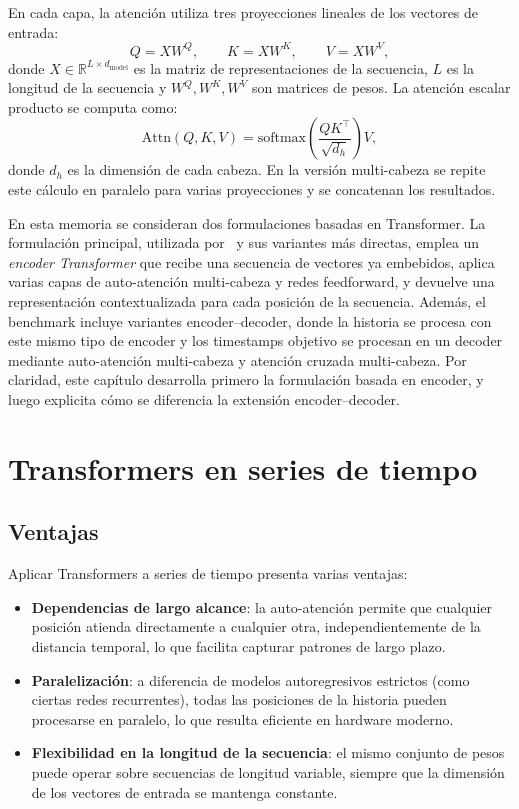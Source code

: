 En cada capa, la atención utiliza tres proyecciones lineales de los vectores de entrada:
\begin{equation}
    Q = X W^Q, \qquad K = X W^K, \qquad V = X W^V,
\end{equation}
donde $X \in \mathbb{R}^{L \times d_{\text{model}}}$ es la matriz de representaciones de la secuencia, $L$ es la longitud de la secuencia y $W^Q, W^K, W^V$ son matrices de pesos. La atención escalar producto se computa como:
\begin{equation}
    \mathrm{Attn}(Q, K, V) = \mathrm{softmax}\!\left(\frac{Q K^\top}{\sqrt{d_h}}\right) V,
\end{equation}
donde $d_h$ es la dimensión de cada cabeza. En la versión multi-cabeza se repite este cálculo en paralelo para varias proyecciones y se concatenan los resultados.

\hfill

En esta memoria se consideran dos formulaciones basadas en Transformer. La formulación principal, utilizada por \CTTransformerBase\ y sus variantes más directas, emplea un \textit{encoder Transformer} que recibe una secuencia de vectores ya embebidos, aplica varias capas de auto-atención multi-cabeza y redes feedforward, y devuelve una representación contextualizada para cada posición de la secuencia. Además, el benchmark incluye variantes encoder--decoder, donde la historia se procesa con este mismo tipo de encoder y los timestamps objetivo se procesan en un decoder mediante auto-atención multi-cabeza y atención cruzada multi-cabeza. Por claridad, este capítulo desarrolla primero la formulación basada en encoder, y luego explicita cómo se diferencia la extensión encoder--decoder.

\section{Transformers en series de tiempo}
\label{sec:transformer-series-tiempo}

\subsection{Ventajas}

Aplicar Transformers a series de tiempo presenta varias ventajas:
\begin{itemize}
    \item \textbf{Dependencias de largo alcance}: la auto-atención permite que cualquier posición atienda directamente a cualquier otra, independientemente de la distancia temporal, lo que facilita capturar patrones de largo plazo.
    \item \textbf{Paralelización}: a diferencia de modelos autoregresivos estrictos (como ciertas redes recurrentes), todas las posiciones de la historia pueden procesarse en paralelo, lo que resulta eficiente en hardware moderno.
    \item \textbf{Flexibilidad en la longitud de la secuencia}: el mismo conjunto de pesos puede operar sobre secuencias de longitud variable, siempre que la dimensión de los vectores de entrada se mantenga constante.
\end{itemize}

